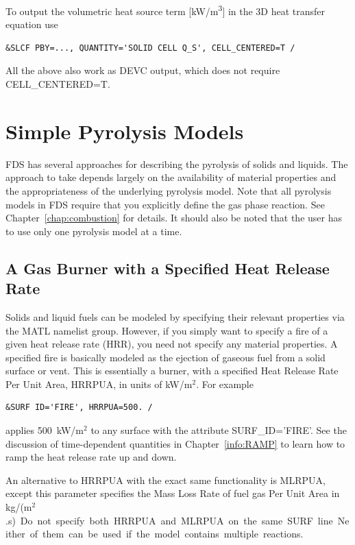 \documentclass[11pt]{book}
\begin{document}
To output the volumetric heat source term [\si{kW/m^3}] in the 3D heat transfer equation use
\begin{lstlisting}
&SLCF PBY=..., QUANTITY='SOLID CELL Q_S', CELL_CENTERED=T /
\end{lstlisting}

All the above also work as {\ct DEVC} output, which does not require {\ct CELL\_CENTERED=T}.

\section{Simple Pyrolysis Models}

FDS has several approaches for describing the pyrolysis of solids and liquids. The approach to take depends largely
on the availability of material properties and the appropriateness of the underlying pyrolysis model.
Note that all pyrolysis models in FDS require that you explicitly define the gas phase reaction. See Chapter~\ref{chap:combustion} for details.
It should also be noted that the user has to use only one pyrolysis model at a time.

\subsection{A Gas Burner with a Specified Heat Release Rate}

\label{info:gas_burner}

Solids and liquid fuels can be modeled by specifying their relevant
properties via the {\ct MATL} namelist group. However, if you simply
want to specify a fire of a given heat release rate (HRR),
you need not specify any material properties. A specified fire is
basically modeled as the ejection of gaseous fuel
from a solid surface or vent. This is essentially a burner, with a
specified Heat Release Rate Per Unit Area, {\ct HRRPUA}, in units of
kW/m$^2$. For example
\begin{lstlisting}
&SURF ID='FIRE', HRRPUA=500. /
\end{lstlisting}
applies 500~kW/m$^2$ to any surface with the attribute
{\ct SURF\_ID='FIRE'}. See the discussion of time-dependent quantities
in Chapter~\ref{info:RAMP} to learn how to ramp the heat release rate up and down.

An alternative to {\ct HRRPUA} with the exact same functionality is {\ct MLRPUA}, except this parameter
specifies the Mass Loss Rate of fuel gas Per Unit Area in \si{kg/(m$^2$.s)}. Do not specify both
{\ct HRRPUA} and {\ct MLRPUA} on the same {\ct SURF} line.  Neither of them can be used if the model contains multiple reactions.
\end{document}

